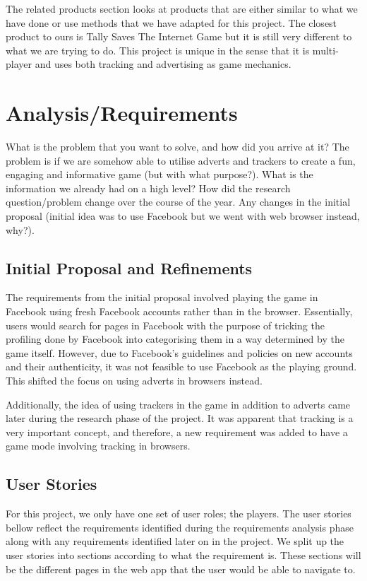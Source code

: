 \documentclass{l4proj}
\begin{document}
The related products section looks at products that are either similar to what we have done or use methods that we have adapted for this project. The closest product to ours is Tally Saves The Internet Game but it is still very different to what we are trying to do. This project is unique in the sense that it is multi-player and uses both tracking and advertising as game mechanics. 

\chapter{Analysis/Requirements}
What is the problem that you want to solve, and how did you arrive at it?
The problem is if we are somehow able to utilise adverts and trackers to create a fun, engaging and informative game (but with what purpose?). What is the information we already had on a high level? How did the research question/problem change over the course of the year. Any changes in the initial proposal (initial idea was to use Facebook but we went with web browser instead, why?).

\section{Initial Proposal and Refinements}
The requirements from the initial proposal involved playing the game in Facebook using fresh Facebook accounts rather than in the browser. Essentially, users would search for pages in Facebook with the purpose of tricking the profiling done by Facebook into categorising them in a way determined by the game itself. However, due to Facebook's guidelines and policies on new accounts and their authenticity, it was not feasible to use Facebook as the playing ground. This shifted the focus on using adverts in browsers instead.

Additionally, the idea of using trackers in the game in addition to adverts came later during the research phase of the project. It was apparent that tracking is a very important concept, and therefore, a new requirement was added to have a game mode involving tracking in browsers.

\section{User Stories}
For this project, we only have one set of user roles; the players. The user stories bellow reflect the requirements identified during the requirements analysis phase along with any requirements identified later on in the project. We split up the user stories into sections according to what the requirement is. These sections will be the different pages in the web app that the user would be able to navigate to.
\end{document}
